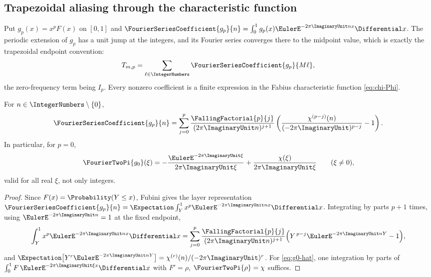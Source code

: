 \subsection{Trapezoidal aliasing through the characteristic function}

Put $g_p(x)=x^{p}F(x)$ on $[0,1]$ and
$\FourierSeriesCoefficient{g_p}{n}
=\int_0^1g_p(x)\EulerE^{-2\pi\ImaginaryUnit nx}\Differential x$.  The periodic
extension of $g_p$ has a unit jump at the integers, and its Fourier
series converges there to the midpoint value, which is exactly the
trapezoidal endpoint convention:
\begin{equation}
 T_{m,p}=\sum_{\ell\in\IntegerNumbers}\FourierSeriesCoefficient{g_p}{M\ell},
 \label{eq:trap-alias}
\end{equation}
the zero-frequency term being $I_p$.  Every nonzero coefficient is a
finite expression in the Fabius characteristic function
\eqref{eq:chi-Phi}.

\begin{lemma}
\label{lem:gp-hat}
For $n\in\IntegerNumbers\setminus\{0\}$,
\begin{equation}
 \FourierSeriesCoefficient{g_p}{n}
 =\sum_{j=0}^{p}
 \frac{\FallingFactorial{p}{j}}{(2\pi\ImaginaryUnit n)^{j+1}}
 \left(
 \frac{\chi^{(p-j)}(n)}{(-2\pi\ImaginaryUnit)^{p-j}}-1
 \right).
 \label{eq:gp-hat-chi}
\end{equation}
In particular, for $p=0$,
\begin{equation}
 \FourierTwoPi{g_0}(\xi)
 =-\frac{\EulerE^{-2\pi\ImaginaryUnit\xi}}{2\pi\ImaginaryUnit\xi}
 +\frac{\chi(\xi)}{2\pi\ImaginaryUnit\xi}
 \qquad(\xi\ne0),
 \label{eq:g0-hat}
\end{equation}
valid for all real $\xi$, not only integers.
\end{lemma}

\begin{proof}
Since $F(x)=\Probability(Y\le x)$, Fubini gives the layer representation
$\FourierSeriesCoefficient{g_p}{n}
=\Expectation\int_Y^1x^{p}\EulerE^{-2\pi\ImaginaryUnit nx}\Differential x$.  Integrating by
parts $p+1$ times, using $\EulerE^{-2\pi\ImaginaryUnit n}=1$ at the fixed endpoint,
\[
 \int_Y^1x^{p}\EulerE^{-2\pi\ImaginaryUnit nx}\Differential x
 =\sum_{j=0}^{p}\frac{\FallingFactorial{p}{j}}{(2\pi\ImaginaryUnit n)^{j+1}}
 \Bigl(Y^{\,p-j}\EulerE^{-2\pi\ImaginaryUnit nY}-1\Bigr),
\]
and $\Expectation\bigl[Y^{r}\EulerE^{-2\pi\ImaginaryUnit nY}\bigr]=\chi^{(r)}(n)/(-2\pi\ImaginaryUnit)^{r}$.
For \eqref{eq:g0-hat}, one integration by parts of
$\int_0^1F\,\EulerE^{-2\pi\ImaginaryUnit\xi x}\Differential x$ with $F'=\rho$,
$\FourierTwoPi{\rho}=\chi$ suffices.
\end{proof}

